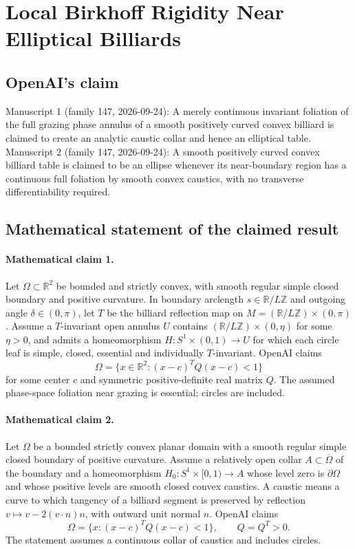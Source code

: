 \documentclass[11pt]{article}
\begin{document}
\section*{Local Birkhoff Rigidity Near Elliptical Billiards}

\subsection{OpenAI's claim}
Manuscript 1 (family 147, 2026-09-24): A merely continuous invariant foliation of the full grazing phase annulus of a smooth positively curved convex billiard is claimed to create an analytic caustic collar and hence an elliptical table. Manuscript 2 (family 147, 2026-09-24): A smooth positively curved convex billiard table is claimed to be an ellipse whenever its near-boundary region has a continuous full foliation by smooth convex caustics, with no transverse differentiability required.

\subsection{Mathematical statement of the claimed result}
\paragraph{Mathematical claim 1.} Let $\Omega\subset\mathbb R^2$ be bounded and strictly convex, with smooth regular simple closed boundary and positive curvature. In boundary arclength $s\in\mathbb R/L\mathbb Z$ and outgoing angle $\delta\in(0,\pi)$, let $T$ be the billiard reflection map on $M=(\mathbb R/L\mathbb Z)\times(0,\pi)$. Assume a $T$-invariant open annulus $U$ contains $(\mathbb R/L\mathbb Z)\times(0,\eta)$ for some $\eta>0$, and admits a homeomorphism $H:S^1\times(0,1)\to U$ for which each circle leaf is simple, closed, essential and individually $T$-invariant. OpenAI claims
\[
\Omega=\{x\in\mathbb R^2:(x-c)^TQ(x-c)<1\}
\]
for some center $c$ and symmetric positive-definite real matrix $Q$. The assumed phase-space foliation near grazing is essential; circles are included.

\paragraph{Mathematical claim 2.} Let $\Omega$ be a bounded strictly convex planar domain with a smooth regular simple closed boundary of positive curvature. Assume a relatively open collar $A\subset\overline\Omega$ of the boundary and a homeomorphism $H_0:S^1\times[0,1)\to A$ whose level zero is $\partial\Omega$ and whose positive levels are smooth closed convex caustics. A caustic means a curve to which tangency of a billiard segment is preserved by reflection $v\mapsto v-2(v\cdot n)n$, with outward unit normal $n$. OpenAI claims
\[
\Omega=\{x:(x-c)^TQ(x-c)<1\},\qquad Q=Q^T>0.
\]
The statement assumes a continuous collar of caustics and includes circles.
\end{document}
